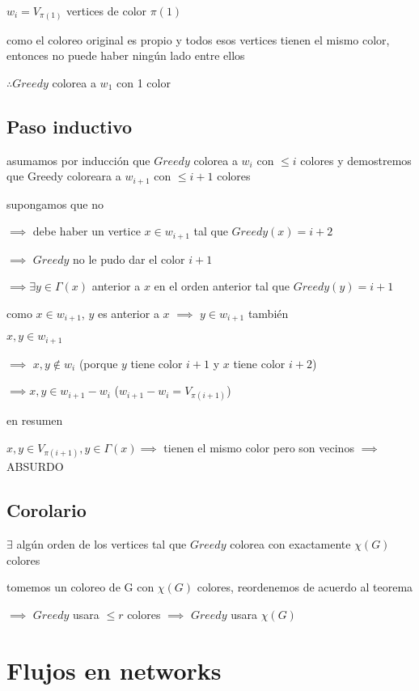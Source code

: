 \documentclass[12pt]{article}
\begin{document}
$w_i = V_{\pi(1)}$ vertices de color $\pi(1)$

como el coloreo original es propio y todos esos vertices tienen el mismo color, entonces no puede haber ningún lado entre ellos

$\therefore Greedy$ colorea a $w_1$ con 1 color


\subsection*{Paso inductivo}

asumamos por inducción que $Greedy$ colorea a $w_i$ con $\leq i$ colores y demostremos que Greedy coloreara a $w_{i+1}$ con $\leq i + 1$ colores

supongamos que no

$\implies$ debe haber un vertice $x \in w_{i+1}$ tal que $Greedy(x) = i + 2$

$\implies$ $Greedy$ no le pudo dar el color $i+1$

$\implies \exists y \in \Gamma(x)$ anterior a $x$ en el orden anterior tal que $Greedy(y) = i + 1$ 
 
como $x \in w_{i+1}$, $y$ es anterior a $x$ $\implies$ $y \in w_{i+1}$ también

$x, y \in w_{i+1}$

$\implies$ $x, y \notin w_i$ (porque $y$ tiene color $i+1$ y $x$ tiene color $i+2$)

$\implies x, y \in w_{i+1} - w_i$  ($w_{i+1} - w_i = V_{\pi(i+1)}$)

en resumen

$x,y \in V_{\pi(i+1)}, y \in \Gamma(x) \implies$ tienen el mismo color pero son vecinos $\implies$ ABSURDO

\subsection*{Corolario}

$\exists$ algún orden de los vertices tal que $Greedy$ colorea con exactamente $\chi(G)$ colores

tomemos un coloreo de G con $\chi(G)$ colores, reordenemos de acuerdo al teorema

$\implies$ $Greedy$ usara $\leq r$ colores $\implies$ $Greedy$ usara $\chi(G)$

\section*{Flujos en networks}
\end{document}
